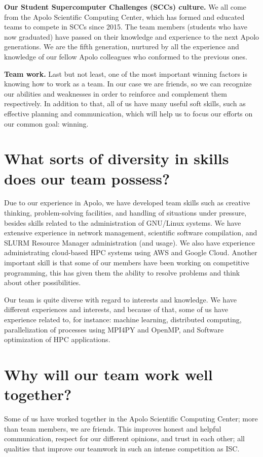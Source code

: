 \documentclass[11pt,a4paper,twocolumn]{article}
\begin{document}
\textbf{Our Student Supercomputer Challenges (SCCs) culture.} We all come from the Apolo Scientific Computing Center, which has formed and educated teams to compete in SCCs since 2015. The team members (students who have now graduated) have passed on their knowledge and experience to the next Apolo generations. We are the fifth generation, nurtured by all the experience and knowledge of our fellow Apolo colleagues who conformed to the previous ones.

\textbf{Team work.} Last but not least, one of the most important winning factors is knowing how to work as a team. In our case we are friends, so we can recognize our abilities and weaknesses in order to reinforce and complement them respectively. In addition to that, all of us have many useful soft skills, such as effective planning and communication, which will help us to focus our efforts on our common goal: winning.

\section{What sorts of diversity in skills does our team possess?}

Due to our experience in Apolo, we have developed team skills such as creative thinking, problem-solving facilities, and handling of situations under pressure, besides skills related to the administration of GNU/Linux systems. We have extensive experience in network management, scientific software compilation, and SLURM Resource Manager administration (and usage). We also have experience administrating cloud-based HPC systems using AWS and Google Cloud. Another important skill is that some of our members have been working on competitive programming, this has given them the ability to resolve problems and think about other possibilities.

Our team is quite diverse with regard to interests and knowledge. We have different experiences and interests, and because of that, some of us have experience related to, for instance: machine learning, distributed computing, parallelization of processes using MPI4PY and OpenMP, and Software optimization of HPC applications.

\section{Why will our team work well together?}

Some of us have worked together in the Apolo Scientific Computing Center; more than team members, we are friends. This improves honest and helpful communication, respect for our different opinions, and trust in each other; all qualities that improve our teamwork in such an intense competition as ISC.
\end{document}
